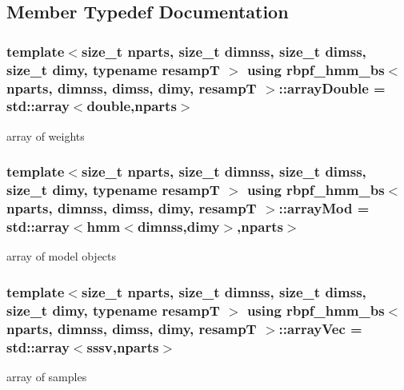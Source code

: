 \subsection{Member Typedef Documentation}
\subsubsection[{\texorpdfstring{array\+Double}{arrayDouble}}]{\setlength{\rightskip}{0pt plus 5cm}template$<$size\+\_\+t nparts, size\+\_\+t dimnss, size\+\_\+t dimss, size\+\_\+t dimy, typename resampT $>$ using {\bf rbpf\+\_\+hmm\+\_\+bs}$<$ nparts, dimnss, dimss, dimy, resampT $>$\+::{\bf array\+Double} =  std\+::array$<$double,nparts$>$}\hypertarget{classrbpf__hmm__bs_a97b5eab2c1fc8acffbdb8941432e8c00}{}\label{classrbpf__hmm__bs_a97b5eab2c1fc8acffbdb8941432e8c00}
array of weights 
\subsubsection[{\texorpdfstring{array\+Mod}{arrayMod}}]{\setlength{\rightskip}{0pt plus 5cm}template$<$size\+\_\+t nparts, size\+\_\+t dimnss, size\+\_\+t dimss, size\+\_\+t dimy, typename resampT $>$ using {\bf rbpf\+\_\+hmm\+\_\+bs}$<$ nparts, dimnss, dimss, dimy, resampT $>$\+::{\bf array\+Mod} =  std\+::array$<${\bf hmm}$<$dimnss,dimy$>$,nparts$>$}\hypertarget{classrbpf__hmm__bs_a9772cd625f6a416ccd54558108b1d7a3}{}\label{classrbpf__hmm__bs_a9772cd625f6a416ccd54558108b1d7a3}
array of model objects 
\subsubsection[{\texorpdfstring{array\+Vec}{arrayVec}}]{\setlength{\rightskip}{0pt plus 5cm}template$<$size\+\_\+t nparts, size\+\_\+t dimnss, size\+\_\+t dimss, size\+\_\+t dimy, typename resampT $>$ using {\bf rbpf\+\_\+hmm\+\_\+bs}$<$ nparts, dimnss, dimss, dimy, resampT $>$\+::{\bf array\+Vec} =  std\+::array$<${\bf sssv},nparts$>$}\hypertarget{classrbpf__hmm__bs_a18441e40d4353bf4b91e6cbac001a28b}{}\label{classrbpf__hmm__bs_a18441e40d4353bf4b91e6cbac001a28b}
array of samples 
